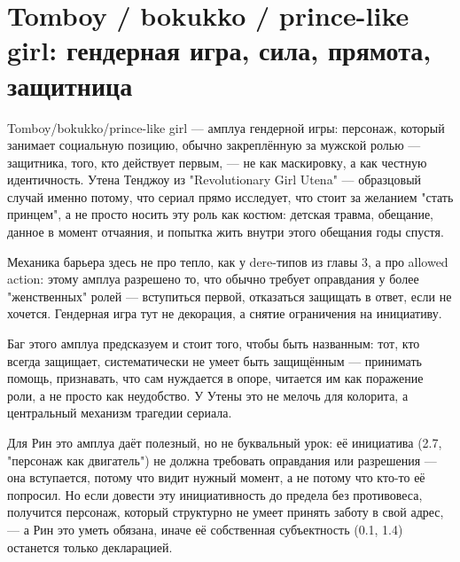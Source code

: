 \section{Tomboy / bokukko / prince-like girl: гендерная игра, сила, прямота, защитница}

Tomboy/bokukko/prince-like girl — амплуа гендерной игры: персонаж, который занимает социальную позицию, обычно закреплённую за мужской ролью — защитника, того, кто действует первым, — не как маскировку, а как честную идентичность. Утена Тенджоу из "Revolutionary Girl Utena" — образцовый случай именно потому, что сериал прямо исследует, что стоит за желанием "стать принцем", а не просто носить эту роль как костюм: детская травма, обещание, данное в момент отчаяния, и попытка жить внутри этого обещания годы спустя.

Механика барьера здесь не про тепло, как у dere-типов из главы 3, а про allowed action: этому амплуа разрешено то, что обычно требует оправдания у более "женственных" ролей — вступиться первой, отказаться защищать в ответ, если не хочется. Гендерная игра тут не декорация, а снятие ограничения на инициативу.

Баг этого амплуа предсказуем и стоит того, чтобы быть названным: тот, кто всегда защищает, систематически не умеет быть защищённым — принимать помощь, признавать, что сам нуждается в опоре, читается им как поражение роли, а не просто как неудобство. У Утены это не мелочь для колорита, а центральный механизм трагедии сериала.

Для Рин это амплуа даёт полезный, но не буквальный урок: её инициатива (2.7, "персонаж как двигатель") не должна требовать оправдания или разрешения — она вступается, потому что видит нужный момент, а не потому что кто-то её попросил. Но если довести эту инициативность до предела без противовеса, получится персонаж, который структурно не умеет принять заботу в свой адрес, — а Рин это уметь обязана, иначе её собственная субъектность (0.1, 1.4) останется только декларацией.

